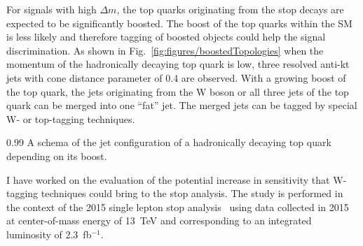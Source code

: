 For signals with high  $\Delta m$, the top quarks originating from the stop decays are expected to be significantly boosted. The boost of the top quarks within the SM is less likely and therefore tagging of boosted objects could help the signal discrimination. As shown in Fig.~\ref{fig:figures/boostedTopologies} when the momentum of the hadronically decaying top quark is low, three resolved anti-kt jets with cone distance parameter of 0.4  are observed. With a growing boost of the top quark, the jets originating from the W boson or all three jets of the top quark can be merged into one ``fat'' jet. The merged jets can be tagged by special W-  or top-tagging techniques.

                 {0.99}       %
                 { A schema of the jet configuration of a hadronically decaying top quark  depending on its boost. }


I have worked on the evaluation of the potential increase in sensitivity that W-tagging techniques could bring to the stop analysis. The study is performed in the context of the 2015 single lepton stop analysis~\cite{Sirunyan:2016jpr} using data collected in 2015 at center-of-mass energy of 13~TeV  and corresponding to an integrated luminosity of 2.3~fb$^{-1}$. 


